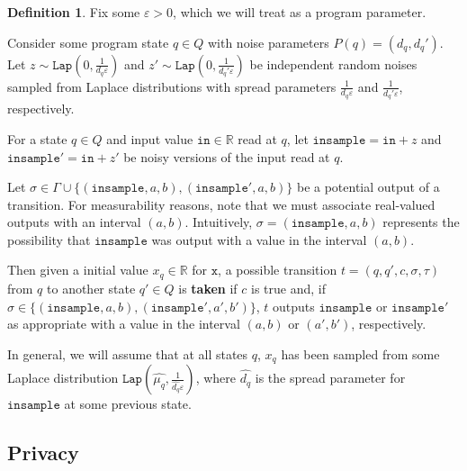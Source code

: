 \documentclass[12pt]{article}
\newcommand{\RR}{\mathbb{R}}
\newcommand{\Lap}{\texttt{Lap}}
\theoremstyle{definition}
\newtheorem{defn}[thm]{Definition}
\begin{document}
\begin{defn}
    Fix some $\varepsilon>0$, which we will treat as a program parameter.

    Consider some program state $q\in Q$ with noise parameters $P(q) = (d_q, d_q')$. Let $z\sim \Lap(0, \frac{1}{d_q\varepsilon})$ and $z'\sim\Lap(0, \frac{1}{d_q'\varepsilon})$ be independent random noises sampled from Laplace distributions with spread parameters $\frac{1}{d_q\varepsilon}$ and $\frac{1}{d_q'\varepsilon}$, respectively.

    For a state $q\in Q$ and input value $\texttt{in}\in \RR$ read at $q$, let $\texttt{insample} = \texttt{in}+z$ and $\texttt{insample}' = \texttt{in}+z'$ be noisy versions of the input read at $q$. 

    Let $\sigma\in \Gamma\cup\{(\texttt{insample}, a, b), (\texttt{insample}', a, b)\}$ be a potential output of a transition. For measurability reasons, note that we must associate real-valued outputs with an interval $(a, b)$. Intuitively, $\sigma = (\texttt{insample}, a, b)$ represents the possibility that $\texttt{insample}$ was output with a value in the interval $(a, b)$. 

    Then given a initial value $x_q\in \RR$ for $\texttt{x}$, a possible transition $t=(q, q', c, \sigma, \tau)$ from $q$ to another state $q'\in Q$ is \textbf{taken} if $c$ is true and, if $\sigma\in \{(\texttt{insample}, a, b), (\texttt{insample}', a', b')\}$, $t$ outputs $\texttt{insample}$ or $\texttt{insample}'$ as appropriate with a value in the interval $(a, b)$ or $(a', b')$, respectively. 
\end{defn}

In general, we will assume that at all states $q$, $x_q$ has been sampled from some Laplace distribution $\Lap(\hat{\mu_q}, \frac{1}{\hat{d_{q}}\varepsilon})$, where $\hat{d_{q}}$ is the spread parameter for $\texttt{insample}$ at some previous state. 

\subsection{Privacy}
\end{document}
